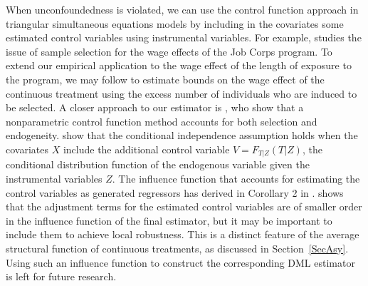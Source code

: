 \documentclass[lettersize, 12pt]{article}
\begin{document}
When unconfoundedness is violated, we can use the control function approach in triangular simultaneous equations models
by including in the covariates some estimated control variables using instrumental variables. 
For example, \cite{Lee09RES} studies the issue of sample selection for the wage effects of the Job Corps program.
To extend our empirical application to the wage effect of the length of exposure to the program, 
we may follow \cite{Lee09RES} to estimate bounds on the wage effect of the continuous treatment using the excess number of individuals who are induced to be selected.
A closer approach to our estimator is 
\cite{DNV03}, who
show that a nonparametric control function method accounts for both selection and endogeneity.
\cite{IN09ETA} show 
that the conditional independence assumption holds when the covariates $X$ include the additional control variable $V = F_{T|Z}(T|Z)$, the conditional distribution function of the endogenous variable given the instrumental variables $Z$. 
The influence function that accounts for estimating the control variables as generated regressors has derived in Corollary 2 in \cite{Lee15}.
\cite{Lee15} shows that the adjustment terms for the estimated control variables are of smaller order
in the influence function of the final estimator, but it may be important to include them to achieve local robustness.
This is a distinct feature of the average structural function of continuous treatments, as discussed in Section~\ref{SecAsy}. 
Using such an influence function to construct the corresponding DML estimator is left for future research.




%
\end{document}
